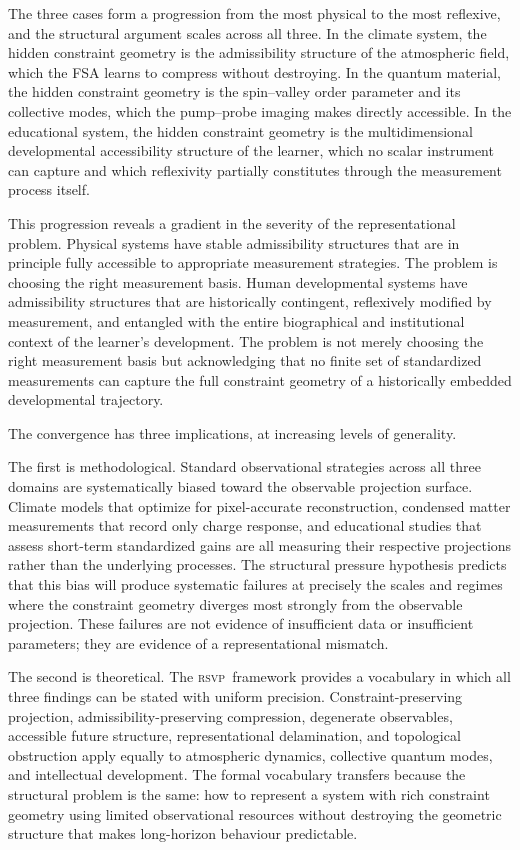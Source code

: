 \documentclass[11pt,a4paper]{article}
\theoremstyle{plain}
\theoremstyle{definition}
\theoremstyle{remark}
\newcommand{\RSVP}{\textup{\textsc{rsvp}}}
\begin{document}
The three cases form a progression from the most physical to the most reflexive,
and the structural argument scales across all three. In the climate system,
the hidden constraint geometry is the admissibility structure of the
atmospheric field, which the FSA learns to compress without destroying. In
the quantum material, the hidden constraint geometry is the spin--valley order
parameter and its collective modes, which the pump--probe imaging makes
directly accessible. In the educational system, the hidden constraint geometry
is the multidimensional developmental accessibility structure of the learner,
which no scalar instrument can capture and which reflexivity partially
constitutes through the measurement process itself.

This progression reveals a gradient in the severity of the representational
problem. Physical systems have stable admissibility structures that are in
principle fully accessible to appropriate measurement strategies. The problem
is choosing the right measurement basis. Human developmental systems have
admissibility structures that are historically contingent, reflexively
modified by measurement, and entangled with the entire biographical and
institutional context of the learner's development. The problem is not merely
choosing the right measurement basis but acknowledging that no finite set of
standardized measurements can capture the full constraint geometry of a
historically embedded developmental trajectory.

The convergence has three implications, at increasing levels of generality.

The first is methodological. Standard observational strategies across all
three domains are systematically biased toward the observable projection
surface. Climate models that optimize for pixel-accurate reconstruction,
condensed matter measurements that record only charge response, and
educational studies that assess short-term standardized gains are all
measuring their respective projections rather than the underlying processes.
The structural pressure hypothesis predicts that this bias will produce
systematic failures at precisely the scales and regimes where the constraint
geometry diverges most strongly from the observable projection. These failures
are not evidence of insufficient data or insufficient parameters; they are
evidence of a representational mismatch.

The second is theoretical. The \RSVP\ framework provides a vocabulary in
which all three findings can be stated with uniform precision. Constraint-preserving
projection, admissibility-preserving compression, degenerate observables,
accessible future structure, representational delamination, and topological
obstruction apply equally to atmospheric dynamics, collective quantum modes,
and intellectual development. The formal vocabulary transfers because the
structural problem is the same: how to represent a system with rich
constraint geometry using limited observational resources without destroying
the geometric structure that makes long-horizon behaviour predictable.
\end{document}
